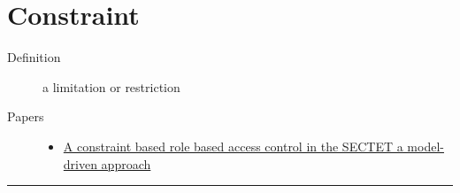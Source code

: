 \documentclass[letterpaper,10pt,english]{sphinxmanual}
\begin{document}
\chapter{Constraint}
\label{categories/constraint::doc}\label{categories/constraint:constraint}\begin{description}
\item[{Definition}] \leavevmode
a limitation or restriction

\item[{Papers}] \leavevmode\begin{itemize}
\item {} 
\href{http://dl.acm.org/citation.cfm?id=1501451}{A constraint based role based access control in the SECTET a model-driven approach}

\end{itemize}

\end{description}


\bigskip\hrule{}\bigskip
\end{document}
